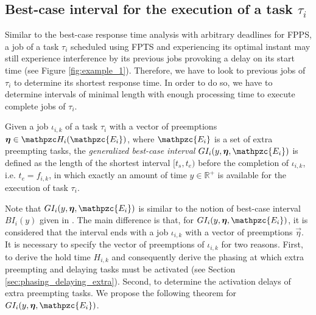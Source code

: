 \subsection{Best-case interval for the execution of a task $\tau_i$}

Similar to the best-case response time analysis with arbitrary deadlines for FPPS, a job of a task $\tau_i$ scheduled using FPTS and experiencing its optimal instant may still experience interference by its previous jobs provoking a delay on its start time (see Figure \ref{fig:example_1}). Therefore, we have to look to previous jobs of $\tau_i$ to determine its shortest response time. In order to do so,  we have to determine intervals of minimal length with enough processing time to execute complete jobs of $\tau_i$.

\begin{definition}\label{def:gen_best_interval}
	Given a job $\iota_{i,k}$ of a task $\tau_i$ with a vector of preemptions $\vec{\eta} \in \hlt_i(\mathpzc{E_i})$, where $\mathpzc{E_i}$ is a set of extra preempting tasks, the \textit{generalized best-case interval} $GI_i(y, \vec{\eta}, \mathpzc{E_i})$ is defined as the length of the shortest interval $[t_s,t_e)$ before the completion of $\iota_{i,k}$, i.e. $t_e = f_{i,k}$, in which exactly an amount of time $y \in \mathbb{R}^+$ is available for the execution of task $\tau_i$.
\end{definition}

Note that $GI_i(y, \vec{\eta},  \mathpzc{E_i})$ is similar to the notion of {best-case interval} $BI_i(y)$ given in \cite{BLM13}. The main difference is that, for $GI_i(y, \vec{\eta},  \mathpzc{E_i})$, it is considered that the interval ends with a job $\iota_{i,k}$ with a vector of preemptions $\vec{\eta}$. It is necessary to specify the vector of preemptions of $\iota_{i,k}$ for two reasons. First, to derive the hold time $H_{i,k}$ and consequently derive the phasing at which extra preempting and delaying tasks must be activated (see Section \ref{sec:phasing_delaying_extra}). Second, to determine the activation delays of extra preempting tasks. We propose the following theorem for $GI_i(y, \vec{\eta},  \mathpzc{E_i})$.

